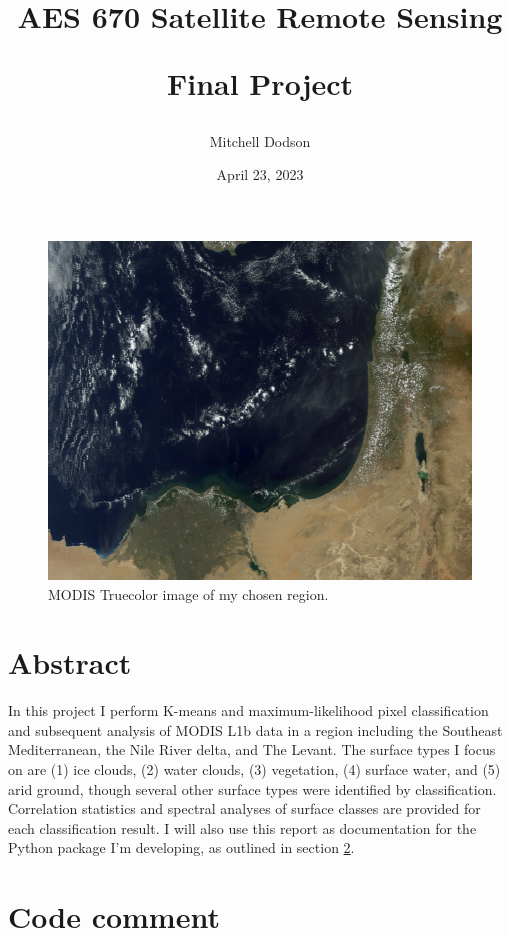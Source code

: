 \documentclass[12pt]{article}
\title{AES 670 Satellite Remote Sensing

Final Project}
\author{Mitchell Dodson}
\date{April 23, 2023}
\begin{document}
\maketitle

\begin{figure}[h!]
    \centering
    \includegraphics[width=.5\paperwidth]{figs/rgbs/rgb_TC.png}
    \caption{MODIS Truecolor image of my chosen region.}
    \label{title_image}
\end{figure}

\section{Abstract}

In this project I perform K-means and maximum-likelihood pixel classification and subsequent analysis of MODIS L1b data in a region including the Southeast Mediterranean, the Nile River delta, and The Levant. The surface types I focus on are (1) ice clouds, (2) water clouds, (3) vegetation, (4) surface water, and (5) arid ground, though several other surface types were identified by classification. Correlation statistics and spectral analyses of surface classes are provided for each classification result.  I will also use this report as documentation for the Python package I'm developing, as outlined in section \ref{code_comment}.

\clearpage

\section{Code comment}\label{code_comment}
\end{document}
